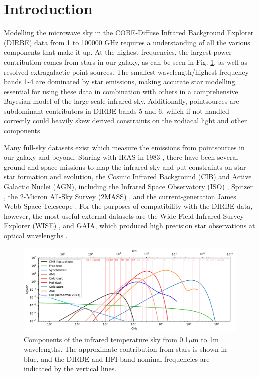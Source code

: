 \documentclass{aa}
\begin{document}
\section{Introduction}

Modelling the microwave sky in the COBE-Diffuse Infrared Background Explorer (DIRBE) data  \citep{DIRBE} from 1 to 100000 GHz requires a  understanding of all the various components that make it up. At the highest frequencies, the largest power contribution comes from stars in our galaxy, as can be seen in Fig. \ref{fig:sed}, as well as resolved extragalactic point sources. The smallest wavelength/highest frequency bands 1-4 are dominated by star emissions, making accurate star modelling essential for using these data in combination with others in a comprehensive Bayesian model of the large-scale infrared sky. Additionally, pointsources are subdominant contributors in DIRBE bands 5 and 6, which if not handled correctly could heavily skew derived constraints on the zodiacal light and other components.

Many full-sky datasets exist which measure the emissions from pointsources in our galaxy and beyond. Staring with IRAS in 1983 \citep{iras}, there have been several ground and space missions to map the infrared sky and put constraints on star star formation and evolution, the Cosmic Infrared Background (CIB) and Active Galactic Nuclei (AGN), including the Infrared Space Observatory (ISO) \citep{iso}, Spitzer \citep{spitzer}, the 2-Micron All-Sky Survey (2MASS) \citep{2mass}, and the current-generation James Webb Space Telescope \citep{jwst}. For the purposes of compatibility with the DIRBE data, however, the most useful external datasets are the Wide-Field Infrared Survey Explorer (WISE) \citep{wise}, and GAIA, which produced high precision star observations at optical wavelengths \citep{gaia, gaia2}. 

\begin{figure}
  \centering
  \includegraphics[width=\textwidth]{figs/sed/all_fgs.pdf}
  \caption{Components of the infrared temperature sky from 0.1$\mu$m to 1m wavelengths. The approximate contribution from stars is shown in blue, and the DIRBE and HFI band nominal frequencies are indicated by the vertical lines.}
  \label{fig:sed}
\end{figure}
\end{document}
